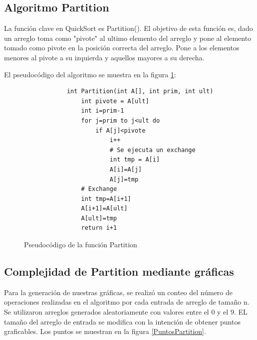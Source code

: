 \hfill \break
\subsection*{Algoritmo Partition}
    La función clave en QuickSort es Partition(). El objetivo de esta función es, dado un arreglo toma como "pivote" al ultimo elemento del arreglo y pone al elemento tomado como pivote en la posición correcta del arreglo. Pone a los elementos menores al pivote a su izquierda y aquellos mayores a su derecha.
    
    El pseudocódigo  del algoritmo se muestra en la figura \ref{PseudocodigoPartition}:
    
    \begin{figure}[h!]
        \centering
        \begin{verbatim}
            int Partition(int A[], int prim, int ult)
                int pivote = A[ult]
                int i=prim-1
                for j=prim to j<ult do 
                    if A[j]<pivote 
                        i++
                        # Se ejecuta un exchange
                        int tmp = A[i]
                        A[i]=A[j]
                        A[j]=tmp
                # Exchange
                int tmp=A[i+1]
                A[i+1]=A[ult]
                A[ult]=tmp
                return i+1
        \end{verbatim}
        \caption{Pseudocódigo de la función Partition}
        \label{PseudocodigoPartition}
    \end{figure}
    
    \subsection*{Complejidad de \textbf{Partition} mediante gráficas}
        Para la generación de nuestras gráficas, se realizó un conteo del número de operaciones realizadas en el algoritmo por cada entrada de arreglo de tamaño n. Se utilizaron arreglos generados aleatoriamente con valores entre el 0 y el 9. EL tamaño del arreglo de entrada se modifica con la intención de obtener puntos graficables. Los puntos se muestran en la figura \ref{PuntosPartition}.\\
        
